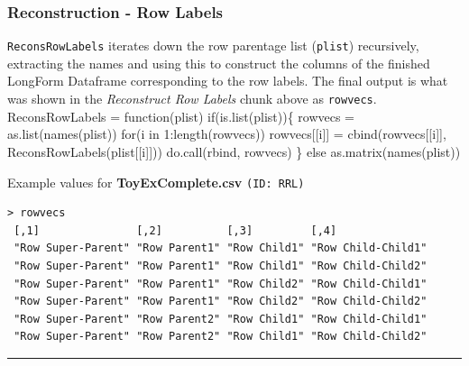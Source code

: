 \documentclass[a4paper]{article}
\begin{document}
\subsubsection{Reconstruction - Row Labels}
\label{sec:ReconsRowLabels}
\verb|ReconsRowLabels| iterates down the row parentage list
(\verb|plist|) recursively, extracting the names and using this to
construct the columns of the finished LongForm Dataframe corresponding
to the row labels. The final output is what was shown in the
\emph{Reconstruct Row Labels} chunk above as \verb|rowvecs|.
\nwenddocs{}\endmoddef
ReconsRowLabels =
  function(plist)
  if(is.list(plist))\{
    rowvecs = as.list(names(plist))
    for(i in 1:length(rowvecs))
      rowvecs[[i]] = cbind(rowvecs[[i]], ReconsRowLabels(plist[[i]]))
    do.call(rbind, rowvecs)
  \} else as.matrix(names(plist))
\eatline
{}\nwendcode{}\nwdocspar

Example values for \textbf{ToyExComplete.csv} \texttt{(ID: RRL)}
\begin{verbatim}
> rowvecs
 [,1]               [,2]          [,3]         [,4]              
 "Row Super-Parent" "Row Parent1" "Row Child1" "Row Child-Child1"
 "Row Super-Parent" "Row Parent1" "Row Child1" "Row Child-Child2"
 "Row Super-Parent" "Row Parent1" "Row Child2" "Row Child-Child1"
 "Row Super-Parent" "Row Parent1" "Row Child2" "Row Child-Child2"
 "Row Super-Parent" "Row Parent2" "Row Child1" "Row Child-Child1"
 "Row Super-Parent" "Row Parent2" "Row Child1" "Row Child-Child2"
\end{verbatim}
\vspace{-1.5em}
\noindent\rule{0.25\textwidth}{0.4pt}
\vspace{0.5em}
\end{document}
